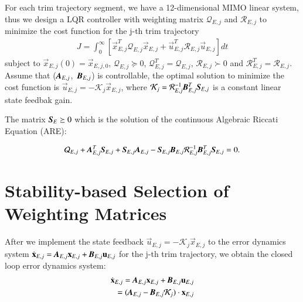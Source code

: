 For each trim trajectory segment, we have a 12-dimensional MIMO linear system, thus we design a LQR controller with weighting matrix $ \mathcal{Q}_{E,j} $ and $\mathcal{R}_{E,j}$ to minimize the cost function for the j-th trim trajectory
\begin{align}
J=\int^{\infty}_{0}[\vec{x}_{E,j}^{T}\mathcal{Q}_{E,j}\vec{x}_{E,j}+\vec{u}_{E,j}^{T}\mathcal{R}_{E,j}
\vec{u}_{E,j}]dt
\end{align}
subject to $\vec{x}_{E,j}(0)=\vec{x}_{E,j,0}$, $\mathcal{Q}_{E,j} \succeq 0$, $\mathcal{Q}_{E,j}^{T}=\mathcal{Q}_{E,j}$, $\mathcal{R}_{E,j} \succ 0$ and $\mathcal{R}_{E,j}^{T}=\mathcal{R}_{E,j}$.
Assume that ($\emph{\textbf{A}}_{E,j}$,~$\emph{\textbf{B}}_{E,j}$) is controllable, the optimal solution to minimize the cost function is $\vec{u}_{E,j}=-\mathcal{K}_{j}\vec{x}_{E,j}$,
where $\mathcal{K}_{j}=\mathcal{R}_{E,j}^{-1}\emph{\textbf{B}}_{E,j}^{T}
\emph{\textbf{S}}_{E,j}$ is a constant linear state feedbak gain.

The matrix $\emph{\textbf{S}}_{E}\succeq 0$  which is the solution of the continuous Algebraic Riccati Equation (ARE):

\begin{align}
\mathcal{Q}_{E,j}+\emph{\textbf{A}}_{E,j}^{T}\emph{\textbf{S}}_{E,j}
+\emph{\textbf{S}}_{E,j}\emph{\textbf{A}}_{E,j}
-\emph{\textbf{S}}_{E,j}\emph{\textbf{B}}_{E,j}\mathcal{R}_{E,j}^{-1}
\emph{\textbf{B}}_{E,j}^{T}\emph{\textbf{S}}_{E,j}=0.
\end{align}

\section{Stability-based Selection of Weighting Matrices}

After we implement the state feedback $\vec{u}_{E,j}=-\mathcal{K}_{j}\vec{x}_{E,j}$ to the error dynamics system $\dot{\vec{x}}_{E,j} =\emph{\textbf{A}}_{E,j}\vec{x}_{E,j}+\emph{\textbf{B}}_{E,j}
\vec{u}_{E,j}$ for the j-th trim trajectory, we obtain the closed loop error dynamics system:
\begin{align}
\dot{\vec{x}}_{E,j}=\emph{\textbf{A}}_{E,j}\vec{x}_{E,j}
+\emph{\textbf{B}}_{E,j}\vec{u}_{E,j} \nonumber \\
=(\emph{\textbf{A}}_{E,j}
-\emph{\textbf{B}}_{E,j}\mathcal{K}_{j})\cdot \vec{x}_{E,j}
\end{align}

